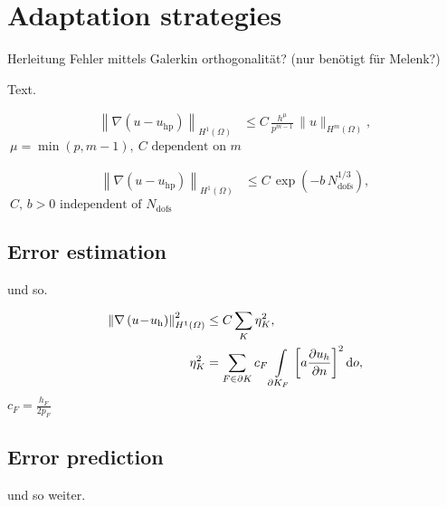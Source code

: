 \section{Adaptation strategies}
\label{sec:strategy}

Herleitung Fehler mittels Galerkin orthogonalität? (nur benötigt für Melenk?)

Text. \cite{mitchell2014}

\begin{align}
\left\|\nabla\left(u \!-\! u_\text{hp}\right)\right\|_{H^{1}(\Omega)} &\leq C \, \frac{h^{\mu}}{p^{m-1}} \, \|u\|_{H^{m}(\Omega)},
\end{align}
$~ \mu \!=\! \min \left(p, m\!-\!1\right),~ C \text{ dependent on } m$

\begin{align}
\left\|\nabla\left(u \!-\! u_\text{hp}\right)\right\|_{H^{1}(\Omega)} &\leq C \, \exp\left(- b \, N_\text{dofs}^{1 / 3}\right),
\end{align}
$~ C,\, b \!>\! 0 \text{ independent of } N_\text{dofs}$



\subsection{Error estimation}
\label{ssec:h}

\cite{kelly1983} und so.

\begin{align}
\left\|\nabla\left(u \!-\! u_\text{h}\right)\right\|^{2}_{H^{1}(\Omega)} &\leq C \sum_{K} \eta_{K}^{2}, \\
\eta_{K}^{2} &= \sum_{F \in \partial K} c_{F} \int\limits_{\partial K_{F}}\left[a \frac{\partial u_{h}}{\partial n}\right]^{2} \mathop{}\!\mathrm{d}o,
\end{align}
$c_F = \frac{h_F}{2 p_F}$



\subsection{Error prediction}

\cite{melenk2001} \cite{ainsworth1998} und so weiter.

